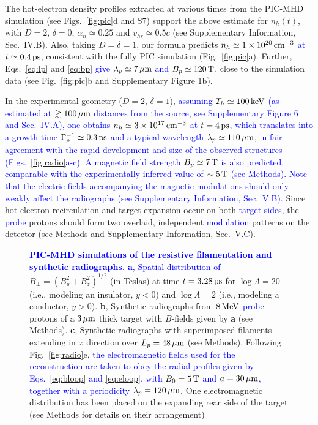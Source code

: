 \documentclass[aps,showpacs,superscriptaddress]{revtex4}
\begin{document}
The hot-electron density profiles extracted at various times from the PIC-MHD simulation (see Figs.~\ref{fig:pic}d and S7) support the above estimate for $n_h(t)$, with $D=2$, $\delta=0$, $\alpha_n \simeq 0.25$ and $v_{hr}\simeq 0.5c$ (see Supplementary Information, Sec.~IV.B). Also, taking $D=\delta=1$, our formula predicts \textcolor{blue}{$n_h \simeq 1 \times 10^{20}\,\rm cm^{-3}$ at $t\simeq 0.4\,\rm ps$}, consistent with the fully PIC simulation (Fig.~\ref{fig:pic}a). Further, Eqs.~\eqref{eq:lp} and \eqref{eq:bp} \textcolor{blue}{give $\lambda_p \simeq 7\,\rm \mu m$ and $B_p \simeq 120\,\rm T$}, close to the simulation data (see Fig.~\ref{fig:pic}b and Supplementary Figure 1b). 

In the experimental geometry ($D=2$, $\delta=1$), \textcolor{blue}{assuming $T_h \simeq 100\,\rm keV$ (as estimated at $\gtrsim 100\,\rm \mu m$ distances from the source, see Supplementary Figure 6 and Sec.~IV.A), one obtains $n_h \simeq 3 \times 10^{17}\,\rm cm^{-3}$ at $t=4\,\rm ps$, which translates into a growth time $\Gamma_p^{-1} \simeq 0.3\,\rm ps$ and a typical wavelength  $\lambda_p \simeq 110\,\rm \mu m$, in fair agreement with the rapid development and size of the observed structures (Figs.~\ref{fig:radio}a-c).
A magnetic field strength $B_p \simeq 7\,\rm T$ is also predicted, comparable with the experimentally inferred value of $\sim 5\,\rm T$ (see Methods). Note that the electric fields accompanying the magnetic modulations \cite{POP_Dieckmann_2009, POP_Bret_Gremillet_2010} should only weakly affect the radiographs (see Supplementary Information, Sec.~V.B).} Since hot-electron recirculation and target expansion occur on both \textcolor{blue}{target sides}, the \textcolor{blue}{probe} protons should form two overlaid, independent \textcolor{blue}{modulation} patterns on the detector (see Methods and Supplementary Information, Sec.~V.C).

\begin{figure*}
\caption{\textcolor{blue}{
\textbf{PIC-MHD simulations of the resistive filamentation and synthetic radiographs.}
\textbf{a}, Spatial distribution of} $B_\perp=(B_y^2+B_z^2)^{1/2}$ (in Teslas) at time $t=3.28\,\rm ps$ for $\log \Lambda=20$ (i.e., modeling an insulator, $y<0$) and $\log\Lambda=2$ (i.e., modeling a conductor, $y>0$).
\textbf{b}, Synthetic radiographs from $8\,\rm MeV$ \textcolor{blue}{probe} protons of a 
$3\,\rm \mu m$ thick target with $B$-fields given by \textbf{a} (see Methods).
\textbf{c}, Synthetic radiographs with superimposed filaments extending in $x$ direction over $L_p=48\,\rm \mu m$ (see Methods).
Following Fig.~\ref{fig:radio}e, \textcolor{blue}{the electromagnetic fields used for the reconstruction are taken to obey the radial profiles given by Eqs.~\eqref{eq:bloop} and \eqref{eq:eloop}, with $B_0=5\,\rm T$ and $a=30\,\rm \mu m$, together with a periodicity $\lambda_p=120\,\rm \mu m$.}
One electromagnetic distribution has been placed on the expanding rear side of the target (see Methods for details on their arrangement) }
\label{fig:kxy}
\end{figure*}
\end{document}
